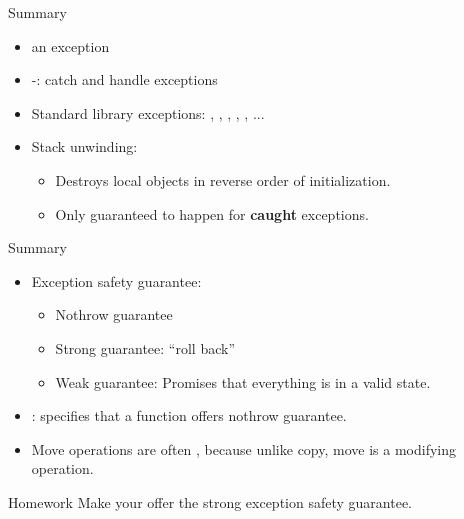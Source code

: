 \documentclass[aspectratio=169]{beamer}
\begin{document}
\begin{frame}{Summary}
  \begin{itemize}
    \item {} an exception
    \item {}-: catch and handle exceptions
    \item Standard library exceptions: , , , , , ...
    \item Stack unwinding:
    \begin{itemize}
      \item Destroys local objects in reverse order of initialization.
      \item Only guaranteed to happen for \textbf{caught} exceptions.
    \end{itemize}
  \end{itemize}
\end{frame}

\begin{frame}{Summary}
  \begin{itemize}
    \item Exception safety guarantee:
    \begin{itemize}
      \item Nothrow guarantee
      \item Strong guarantee: ``roll back''
      \item Weak guarantee: Promises that everything is in a valid state.
    \end{itemize}
    \item {}: specifies that a function offers nothrow guarantee.
    \item Move operations are often , because unlike copy, move is a modifying operation.
  \end{itemize}
\end{frame}

\begin{frame}{Homework}
  Make your  offer the strong exception safety guarantee.
\end{frame}
\end{document}
